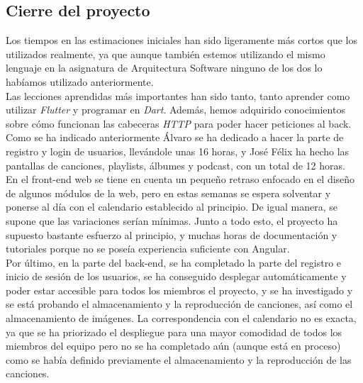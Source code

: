 \documentclass{article}
\begin{document}
\subsection{Cierre del proyecto}
Los tiempos en las estimaciones iniciales han sido ligeramente más cortos que los utilizados realmente, ya que aunque también estemos utilizando el mismo lenguaje en la asignatura de Arquitectura Software ninguno de los dos lo habíamos utilizado anteriormente.\\
\hfill \break
Las lecciones aprendidas más importantes han sido tanto, tanto aprender como utilizar \textit{Flutter} y programar en \textit{Dart}. Además, hemos adquirido conocimientos sobre cómo funcionan las cabeceras \textit{HTTP} para poder hacer peticiones al back.\\
Como se ha indicado anteriormente Álvaro se ha dedicado a hacer la parte de registro y login de usuarios, llevándole unas 16 horas, y José Félix ha hecho las pantallas de canciones, playlists, álbumes y podcast, con un total de 12 horas.\\
\hfill \break
En el front-end web se tiene en cuenta un pequeño retraso enfocado en el diseño de algunos módulos de la web, pero en estas semanas se espera solventar y ponerse al día con el calendario establecido al principio. De igual manera, se supone que las variaciones serían mínimas. Junto a todo esto, el proyecto ha supuesto bastante esfuerzo al principio, y muchas horas de documentación y tutoriales porque no se poseía experiencia suficiente con Angular.\\
\hfill \break
Por último, en la parte del back-end, se ha completado la parte del registro e inicio de sesión de los usuarios, se ha conseguido desplegar automáticamente y poder estar accesible para todos los miembros el proyecto, y se ha investigado y se está probando el almacenamiento y la reproducción de canciones, así como el almacenamiento de imágenes. La correspondencia con el calendario no es exacta, ya que se ha priorizado el despliegue para una mayor comodidad de todos los miembros del equipo pero no se ha completado aún (aunque está en proceso) como se había definido previamente el almacenamiento y la reproducción de las canciones.
\end{document}
